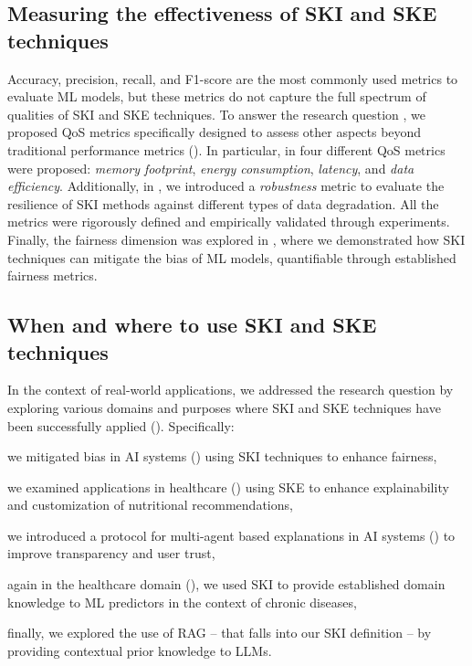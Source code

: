 \subsection*{Measuring the effectiveness of \gls{SKI} and \gls{SKE} techniques}
%
Accuracy, precision, recall, and F1-score are the most commonly used metrics to evaluate \gls{ML} models, but these metrics do not capture the full spectrum of qualities of \gls{SKI} and \gls{SKE} techniques.
%
To answer the research question , we proposed \gls{QoS} metrics specifically designed to assess other aspects beyond traditional performance metrics ().
%
In particular, in  four different \gls{QoS} metrics were proposed: \emph{memory footprint}, \emph{energy consumption}, \emph{latency}, and \emph{data efficiency}.
%
Additionally, in , we introduced a \emph{robustness} metric to evaluate the resilience of \gls{SKI} methods against different types of data degradation.
%
All the metrics were rigorously defined and empirically validated through experiments.
%
Finally, the fairness dimension was explored in , where we demonstrated how \gls{SKI} techniques can mitigate the bias of \gls{ML} models, quantifiable through established fairness metrics.


\subsection*{When and where to use \gls{SKI} and \gls{SKE} techniques}
%
In the context of real-world applications, we addressed the research question  by exploring various domains and purposes where \gls{SKI} and \gls{SKE} techniques have been successfully applied ().
%
Specifically:
%
\begin{inlinelist}
    \item we mitigated bias in \gls{AI} systems () using \gls{SKI} techniques to enhance fairness,
    \item we examined applications in healthcare () using \gls{SKE} to enhance explainability and customization of nutritional recommendations,
    \item we introduced a protocol for multi-agent based explanations in \gls{AI} systems () to improve transparency and user trust,
    \item again in the healthcare domain (), we used \gls{SKI} to provide established domain knowledge to \gls{ML} predictors in the context of chronic diseases,
    \item finally, we explored the use of \gls{RAG} -- that falls into our \gls{SKI} definition -- by providing contextual prior knowledge to \glspl{LLM}.
\end{inlinelist}


